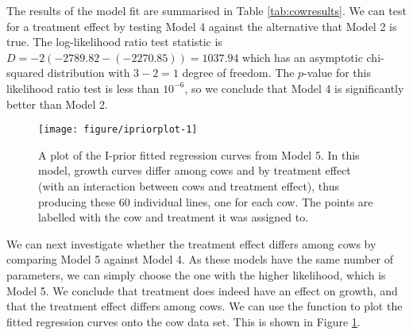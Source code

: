 The results of the model fit are summarised in Table \ref{tab:cowresults}. We can test for a treatment effect by testing Model 4 against the alternative that Model 2 is true. The log-likelihood ratio test statistic is $D = -2(-2789.82 - (-2270.85)) = 1037.94$ which has an asymptotic chi-squared distribution with $3 - 2 = 1$ degree of freedom. The $p$-value for this likelihood ratio test is less than $10^{-6}$, so we conclude that Model 4 is significantly better than Model 2.

\begin{knitrout}
\color{fgcolor}\begin{figure}[H]

{\centering \texttt{[image: figure/ipriorplot-1]} 

}

\caption[A plot of the I-prior fitted regression curves from Model 5]{A plot of the I-prior fitted regression curves from Model 5. In this model, growth curves differ among cows and by treatment effect (with an interaction between cows and treatment effect), thus producing these 60 individual lines, one for each cow. The points are labelled with the cow  and treatment  it was assigned to.}\label{fig:ipriorplot}
\end{figure}


\end{knitrout}

We can next investigate whether the treatment effect differs among cows by comparing Model 5 against Model 4. As these models have the same number of parameters, we can simply choose the one with the higher likelihood, which is Model 5. We conclude that treatment does indeed have an effect on growth, and that the treatment effect differs among cows. We can use the  function to plot the fitted regression curves onto the cow data set. This is shown in Figure \ref{fig:ipriorplot}.

%
%
%
